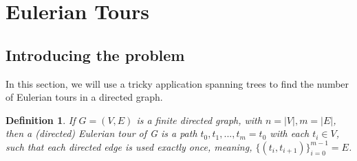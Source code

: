 \documentclass[11pt]{article}
\newtheorem{definition}[theorem]{Definition}
\newcommand{\keyword}[1]{{\emph{#1}}}
\begin{document}
\section{Eulerian Tours}
\subsection{Introducing the problem}

In this section, we will use a tricky application spanning trees to find the number of Eulerian tours in a directed graph.

\begin{definition}
	If $G = (V,E)$ is a finite directed graph, with $n=|V|, m=|E|$, then a \keyword{(directed) Eulerian tour} of G is a path $t_0, t_1, ..., t_m=t_0$ with each $t_i \in V$, such that each directed edge is used exactly once, meaning, 																$\{(t_i,t_{i+1})\}_{i=0}^{m-1}=E$.
\end{definition}
\end{document}
